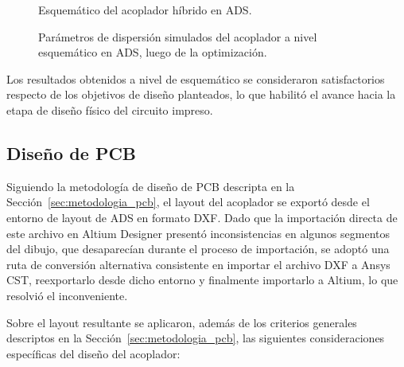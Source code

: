 \begin{figure}[H]
    \centering
    \caption{Esquemático del acoplador híbrido en ADS.}
    \label{fig:acoplador_esquematico_ads}
\end{figure}

\begin{figure}[H]
    \centering
    \caption{Parámetros de dispersión simulados del acoplador a nivel esquemático en ADS, luego de la optimización.}
    \label{fig:acoplador_resultados_ads}
\end{figure}

Los resultados obtenidos a nivel de esquemático se consideraron satisfactorios respecto de los objetivos de diseño planteados, lo que habilitó el avance hacia la etapa de diseño físico del circuito impreso.

\subsection{Diseño de PCB}
Siguiendo la metodología de diseño de PCB descripta en la Sección~\ref{sec:metodologia_pcb}, el layout del acoplador se exportó desde el entorno de layout de ADS en formato DXF. Dado que la importación directa de este archivo en Altium Designer presentó inconsistencias en algunos segmentos del dibujo, que desaparecían durante el proceso de importación, se adoptó una ruta de conversión alternativa consistente en importar el archivo DXF a Ansys CST, reexportarlo desde dicho entorno y finalmente importarlo a Altium, lo que resolvió el inconveniente.

Sobre el layout resultante se aplicaron, además de los criterios generales descriptos en la Sección~\ref{sec:metodologia_pcb}, las siguientes consideraciones específicas del diseño del acoplador:

